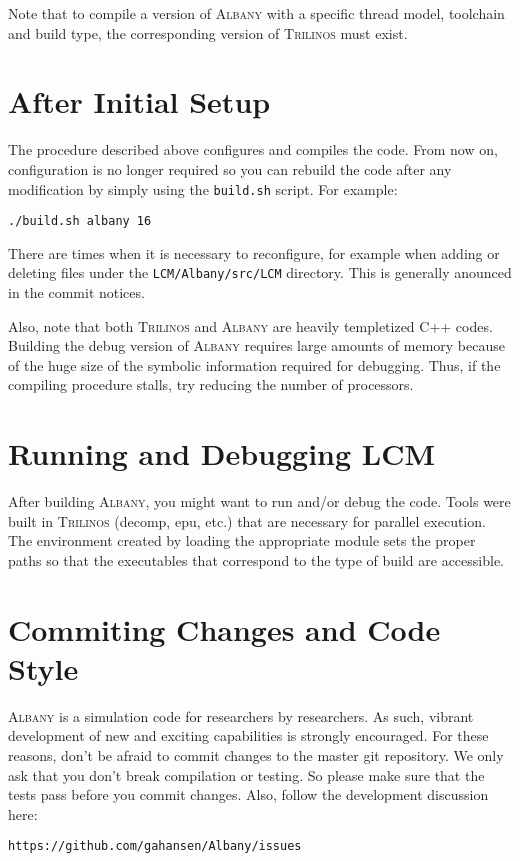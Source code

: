 \documentclass{article}
\newcommand{\trilinos}{\textsc{Trilinos}}
\newcommand{\albany}{\textsc{Albany}}
\newcommand{\lcm}{\textsc{LCM}}
\begin{document}
Note that to compile a version of \albany{} with a specific thread model,
toolchain and build type, the corresponding version of \trilinos{} must
exist.

\section{After Initial Setup}
The procedure described above configures and compiles the code. From
now on, configuration is no longer required so you can rebuild the
code after any modification by simply using the \verb+build.sh+
script. For example:
\begin{verbatim}
./build.sh albany 16
\end{verbatim}
There are times when it is necessary to reconfigure, for example when
adding or deleting files under the \verb+LCM/Albany/src/LCM+
directory. This is generally anounced in the commit notices.

Also, note that both \trilinos{} and \albany{} are heavily templetized
C++ codes. Building the debug version of \albany{} requires large
amounts of memory because of the huge size of the symbolic information
required for debugging. Thus, if the compiling procedure stalls, try
reducing the number of processors.

\section{Running and Debugging \lcm{}} 

After building \albany{}, you might want to run and/or debug the code.
Tools were built in \trilinos{} (decomp, epu, etc.) that are necessary
for parallel execution. The environment created by loading the
appropriate module sets the proper paths so that the executables that
correspond to the type of build are accessible.

\section{Commiting Changes and Code Style}
\albany{} is a simulation code for researchers by researchers. As
such, vibrant development of new and exciting capabilities is strongly
encouraged. For these reasons, don't be afraid to commit changes to
the master git repository. We only ask that you don't break
compilation or testing. So please make sure that the tests pass before
you commit changes. Also, follow the development discussion here:
\begin{verbatim}
https://github.com/gahansen/Albany/issues
\end{verbatim}
\end{document}
